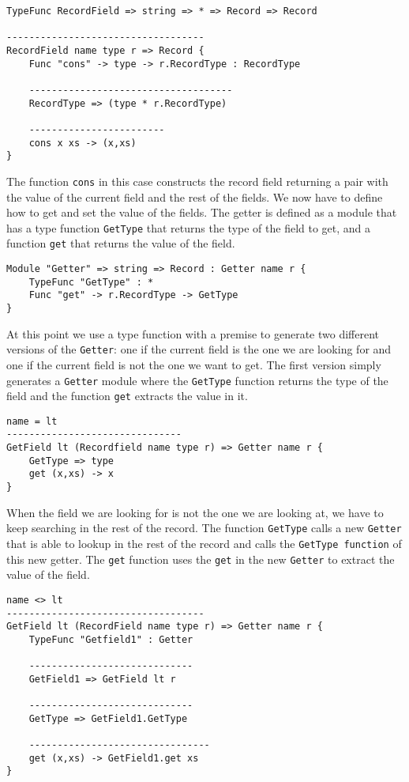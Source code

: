 \begin{lstlisting}
TypeFunc RecordField => string => * => Record => Record

-----------------------------------
RecordField name type r => Record {
	Func "cons" -> type -> r.RecordType : RecordType

	------------------------------------
	RecordType => (type * r.RecordType)

	------------------------
	cons x xs -> (x,xs)
}
\end{lstlisting}

The function \texttt{cons} in this case constructs the record field returning a pair with the value of the current field and the rest of the fields.
We now have to define how to get and set the value of the fields. The getter is defined as a module that has a type function \texttt{GetType} that returns the type of the field to get, and a function \texttt{get} that returns the value of the field. 

\begin{lstlisting}
Module "Getter" => string => Record : Getter name r {
	TypeFunc "GetType" : *
	Func "get" -> r.RecordType -> GetType
}
\end{lstlisting}

At this point we use a type function with a premise to generate two different versions of the \texttt{Getter}: one if the current field is the one we are looking for and one if the current field is not the one we want to get. The first version simply generates a \texttt{Getter} module where the \texttt{GetType} function returns the type of the field and the function \texttt{get} extracts the value in it.

\begin{lstlisting}
name = lt
-------------------------------
GetField lt (Recordfield name type r) => Getter name r {
	GetType => type
	get (x,xs) -> x
}
\end{lstlisting}

When the field we are looking for is not the one we are looking at, we have to keep searching in the rest of the record. The function \texttt{GetType} calls a new \texttt{Getter} that is able to lookup in the rest of the record and calls the \texttt{GetType function} of this new getter. The \texttt{get} function uses the \texttt{get} in the new \texttt{Getter} to extract the value of the field.

\begin{lstlisting}
name <> lt
-----------------------------------
GetField lt (RecordField name type r) => Getter name r {
	TypeFunc "Getfield1" : Getter
	
	-----------------------------
	GetField1 => GetField lt r
	
	-----------------------------
	GetType => GetField1.GetType
	
	--------------------------------
	get (x,xs) -> GetField1.get xs
}
\end{lstlisting}

